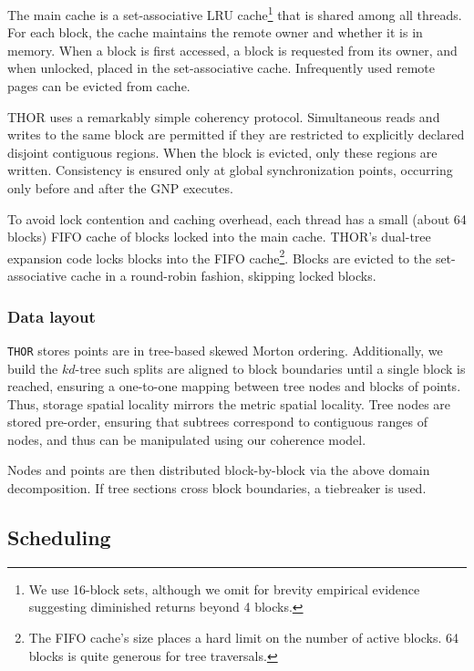 \documentclass[twoside,leqno,twocolumn]{article}
\newcommand{\THOR}{{{\tt THOR}} }
\newcommand{\mysubsub}[1]{\subsubsection{#1} }
\begin{document}
The main cache is a set-associative LRU cache\footnote{We use 16-block sets, although we omit for brevity empirical evidence suggesting diminished returns beyond 4 blocks.} that is shared among all threads.
For each block, the cache maintains the remote owner and whether it is in memory.
When a block is first accessed, a block is requested from its owner, and when unlocked, placed in the set-associative cache.
Infrequently used remote pages can be evicted from cache.

THOR uses a remarkably simple coherency protocol.
Simultaneous reads and writes to the same block are permitted if they are restricted to explicitly declared disjoint contiguous regions.
When the block is evicted, only these regions are written.
Consistency is ensured only at global synchronization points, occurring only before and after the GNP executes.

To avoid lock contention and caching overhead, each thread has a small (about 64 blocks) FIFO cache of blocks locked into the main cache.
THOR's dual-tree expansion code locks blocks into the FIFO cache\footnote{The FIFO cache's size places a hard limit on the number of active blocks.  64 blocks is quite generous for tree traversals.}.
Blocks are evicted to the set-associative cache in a round-robin fashion, skipping locked blocks.

\mysubsub{Data layout}
\THOR stores points are in tree-based skewed Morton ordering.
Additionally, we build the $kd$-tree such splits are aligned to block boundaries until a single block is reached, ensuring a one-to-one mapping between tree nodes and blocks of points.
Thus, storage spatial locality mirrors the metric spatial locality.
Tree nodes are stored pre-order, ensuring that subtrees correspond to contiguous ranges of nodes, and thus can be manipulated using our coherence model.

Nodes and points are then distributed block-by-block via the above domain decomposition.
If tree sections cross block boundaries, a tiebreaker is used.

\subsection{Scheduling}
\end{document}
